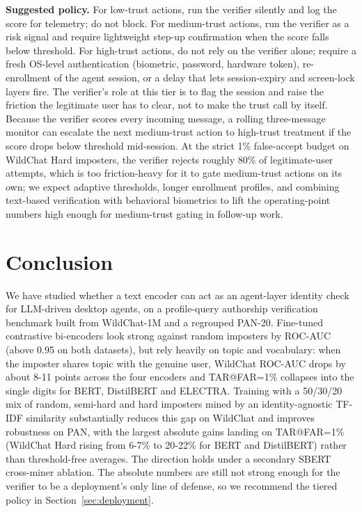 \documentclass[11pt]{article}
\begin{document}
\noindent\textbf{Suggested policy.} For low-trust actions, run the verifier silently and log the score for telemetry; do not block. For medium-trust actions, run the verifier as a risk signal and require lightweight step-up confirmation when the score falls below threshold. For high-trust actions, do not rely on the verifier alone; require a fresh OS-level authentication (biometric, password, hardware token), re-enrollment of the agent session, or a delay that lets session-expiry and screen-lock layers fire. The verifier's role at this tier is to flag the session and raise the friction the legitimate user has to clear, not to make the trust call by itself. Because the verifier scores every incoming message, a rolling three-message monitor can escalate the next medium-trust action to high-trust treatment if the score drops below threshold mid-session. At the strict 1\% false-accept budget on WildChat Hard imposters, the verifier rejects roughly 80\% of legitimate-user attempts, which is too friction-heavy for it to gate medium-trust actions on its own; we expect adaptive thresholds, longer enrollment profiles, and combining text-based verification with behavioral biometrics to lift the operating-point numbers high enough for medium-trust gating in follow-up work.

\section{Conclusion}
\label{sec:conclusion}

We have studied whether a text encoder can act as an agent-layer identity check for LLM-driven desktop agents, on a profile-query authorship verification benchmark built from WildChat-1M and a regrouped PAN-20. Fine-tuned contrastive bi-encoders look strong against random imposters by ROC-AUC (above 0.95 on both datasets), but rely heavily on topic and vocabulary: when the imposter shares topic with the genuine user, WildChat ROC-AUC drops by about 8-11 points across the four encoders and TAR@FAR=1\% collapses into the single digits for BERT, DistilBERT and ELECTRA. Training with a 50/30/20 mix of random, semi-hard and hard imposters mined by an identity-agnostic TF-IDF similarity substantially reduces this gap on WildChat and improves robustness on PAN, with the largest absolute gains landing on TAR@FAR=1\% (WildChat Hard rising from 6-7\% to 20-22\% for BERT and DistilBERT) rather than threshold-free averages. The direction holds under a secondary SBERT cross-miner ablation. The absolute numbers are still not strong enough for the verifier to be a deployment's only line of defense, so we recommend the tiered policy in Section~\ref{sec:deployment}.
\end{document}
